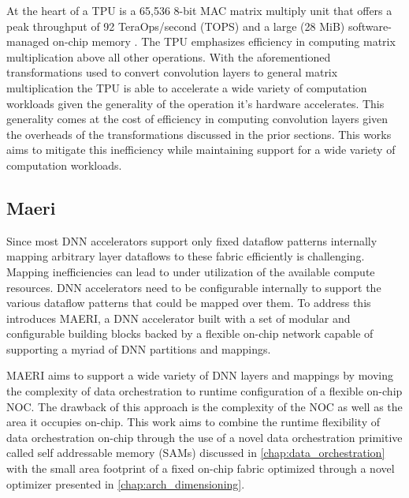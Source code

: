 At the heart of a TPU is a 65,536 8-bit MAC matrix multiply unit that offers a
peak throughput of 92 TeraOps/second (TOPS) and a large (28 MiB)
software-managed on-chip memory \cite{tpu}. The TPU emphasizes efficiency in
computing matrix multiplication above all other operations. With the
aforementioned transformations used to convert convolution layers to general
matrix multiplication the TPU is able to accelerate a wide variety of
computation workloads given the generality of the operation it's hardware
accelerates. This generality comes at the cost of efficiency in computing
convolution layers given the overheads of the transformations discussed in the
prior sections. This works aims to mitigate this inefficiency while maintaining
support for a wide variety of computation workloads. 


\subsection{Maeri}
\label{chap:related_work:maeri}

Since most DNN accelerators support only fixed dataflow patterns internally
mapping arbitrary layer dataflows to these fabric efficiently is challenging.
Mapping inefficiencies can lead to under utilization of the available compute
resources. DNN accelerators need to be configurable internally to support the
various dataflow patterns that could be mapped over them. To address this
\cite{maeri} introduces MAERI, a DNN accelerator built with a set of modular and
configurable building blocks backed by a flexible on-chip network capable of
supporting a myriad of DNN partitions and mappings. 

MAERI aims to support a wide variety of DNN layers and mappings by moving the
complexity of data orchestration to runtime configuration of a flexible on-chip
NOC. The drawback of this approach is the complexity of the NOC as well as the
area it occupies on-chip. This work aims to combine the runtime flexibility of
data orchestration on-chip through the use of a novel data orchestration
primitive called self addressable memory (SAMs) discussed in
\autoref{chap:data_orchestration} with the small area footprint of a fixed
on-chip fabric optimized through a novel optimizer presented in
\autoref{chap:arch_dimensioning}. 





